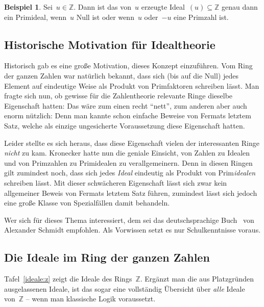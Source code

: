 \documentclass[a4paper,ngerman,12pt]{scrartcl}
\theoremstyle{definition}
\newtheorem{bsp}[defn]{Beispiel}
\theoremstyle{plain}
\theoremstyle{remark}
\newcommand{\ZZ}{\mathbb{Z}}
\renewcommand{\_}{\mathpunct{.}\,}
\newcommand{\?}{\,{:}\,}
\begin{document}
\begin{bsp}Sei~$u \in \ZZ$. Dann ist das von~$u$ erzeugte Ideal~$(u) \subseteq
\ZZ$ genau dann ein Primideal, wenn~$u$ Null ist oder wenn~$u$ oder~$-u$ eine
Primzahl ist.\end{bsp}


\subsection{Historische Motivation für Idealtheorie}

Historisch gab es eine große Motivation, dieses Konzept einzuführen. Vom Ring
der ganzen Zahlen war natürlich bekannt, dass sich (bis auf die Null) jedes
Element auf eindeutige Weise als Produkt von Primfaktoren schreiben lässt. Man
fragte sich nun, ob gewisse für die Zahlentheorie relevante Ringe dieselbe
Eigenschaft hatten: Das wäre zum einen recht "`nett"', zum anderen aber auch
enorm nützlich: Denn man kannte schon einfache Beweise von Fermats letztem
Satz, welche als einzige ungesicherte Voraussetzung diese Eigenschaft hatten.

Leider stellte es sich heraus, dass diese Eigenschaft vielen der interessanten
Ringe \emph{nicht} zu kam. Kronecker hatte nun die geniale Einsicht, von
Zahlen zu Idealen und von Primzahlen zu Primidealen zu verallgemeinern. Denn in
diesen Ringen gilt zumindest noch, dass sich jedes \emph{Ideal} eindeutig als
Produkt von Prim\emph{idealen} schreiben lässt. Mit dieser schwächeren Eigenschaft
lässt sich zwar kein allgemeiner Beweis von Fermats letztem Satz führen,
zumindest lässt sich jedoch eine große Klasse von Spezialfällen damit
behandeln.

Wer sich für dieses Thema interessiert, dem sei das deutschsprachige
Buch~\cite{schmidt:zahlentheorie} von Alexander Schmidt empfohlen. Als Vorwissen
setzt es nur Schulkenntnisse voraus.


\subsection{Die Ideale im Ring der ganzen Zahlen}

Tafel~\ref{ideale:z} zeigt die Ideale des Rings~$\ZZ$.
Ergänzt man die aus Platzgründen ausgelassenen Ideale, ist das
sogar eine vollständig Übersicht über \emph{alle} Ideale von~$\ZZ$ --
wenn man klassische Logik voraussetzt.
\end{document}
